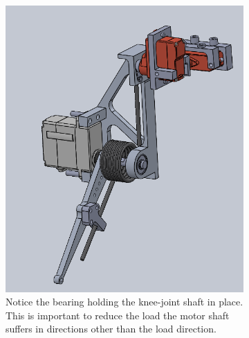 \begin{figure}[h!]
    \centering
    \begin{subfigure}[b]{0.45\textwidth}
        \includegraphics[width=\textwidth]{Images/CAD_leg_inside_bent.png}
        \caption{Notice the bearing holding the knee-joint shaft in place. This is important to reduce the load the motor shaft suffers in directions other than the load direction.}
        \label{fig:image1}
    \end{subfigure}
    \hfill
    \begin{subfigure}[b]{0.45\textwidth}

\end{subfigure}
\end{figure}
